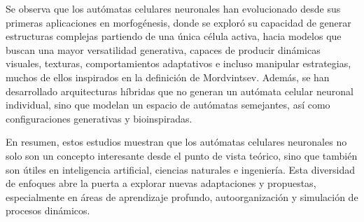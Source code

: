 Se observa que los autómatas celulares neuronales han evolucionado desde sus primeras aplicaciones en morfogénesis, donde se exploró su capacidad de generar estructuras complejas partiendo de una única célula activa, hacia modelos que buscan una mayor versatilidad generativa, capaces de producir dinámicas visuales, texturas, comportamientos adaptativos e incluso manipular estrategias, muchos de ellos inspirados en la definición de Mordvintsev. Además, se han desarrollado arquitecturas híbridas que no generan un autómata celular neuronal individual, sino que modelan un espacio de autómatas semejantes, así como configuraciones generativas y bioinspiradas.

En resumen, estos estudios muestran que los autómatas celulares neuronales no solo son un concepto interesante desde el punto de vista teórico, sino que también son útiles en inteligencia artificial, ciencias naturales e ingeniería. Esta diversidad de enfoques abre la puerta a explorar nuevas adaptaciones y propuestas, especialmente en áreas de aprendizaje profundo, autoorganización y simulación de procesos dinámicos.

